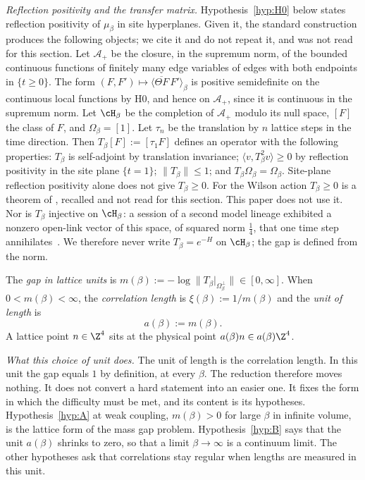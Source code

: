 \emph{Reflection positivity and the transfer matrix.} Hypothesis~\ref{hyp:H0} below states reflection positivity of $\mu_\beta$ in site hyperplanes. Given it, the standard construction \cite{OS78} produces the following objects; we cite it and do not repeat it, and \cite{OS78} was not read for this section. Let $\mathcal{A}_+$ be the closure, in the supremum norm, of the bounded continuous functions of finitely many edge variables of edges with both endpoints in $\{t\ge0\}$. The form $(F,F')\mapsto\langle\overline{\Theta F}\,F'\rangle_\beta$ is positive semidefinite on the continuous local functions by H0, and hence on $\mathcal{A}_+$, since it is continuous in the supremum norm. Let $\cH_\beta$ be the completion of $\mathcal{A}_+$ modulo its null space, $[F]$ the class of $F$, and $\Omega_\beta=[1]$. Let $\tau_n$ be the translation by $n$ lattice steps in the time direction. Then $T_\beta[F]:=[\tau_1F]$ defines an operator with the following properties: $T_\beta$ is self-adjoint by translation invariance; $\langle v,T_\beta^2v\rangle\ge0$ by reflection positivity in the site plane $\{t=1\}$; $\|T_\beta\|\le1$; and $T_\beta\Omega_\beta=\Omega_\beta$. Site-plane reflection positivity alone does not give $T_\beta\ge0$. For the Wilson action $T_\beta\ge0$ is a theorem of \cite{Lu77}, recalled and not read for this section. This paper does not use it. Nor is $T_\beta$ injective on $\cH_\beta$: a session of a second model lineage exhibited a nonzero open-link vector of this space, of squared norm $\tfrac14$, that one time step annihilates~\cite[comments 7105447358, 7104999220]{RepoThread}. We therefore never write $T_\beta=e^{-H}$ on $\cH_\beta$; the gap is defined from the norm.

\begin{definition}\label{red:def-gap}
The \emph{gap in lattice units} is $m(\beta):=-\log\|T_\beta|_{\Omega_\beta^\perp}\|\in[0,\infty]$. When $0<m(\beta)<\infty$, the \emph{correlation length} is $\xi(\beta):=1/m(\beta)$ and the \emph{unit of length} is
\[
  a(\beta):=m(\beta).
\]
A lattice point $n\in\Z^4$ sits at the physical point $a(\beta)n\in a(\beta)\Z^4$.
\end{definition}

\emph{What this choice of unit does.} The unit of length is the correlation length. In this unit the gap equals $1$ by definition, at every $\beta$. The reduction therefore moves nothing. It does not convert a hard statement into an easier one. It fixes the form in which the difficulty must be met, and its content is its hypotheses. Hypothesis~\ref{hyp:A} at weak coupling, $m(\beta)>0$ for large $\beta$ in infinite volume, is the lattice form of the mass gap problem. Hypothesis~\ref{hyp:B} says that the unit $a(\beta)$ shrinks to zero, so that a limit $\beta\to\infty$ is a continuum limit. The other hypotheses ask that correlations stay regular when lengths are measured in this unit.

